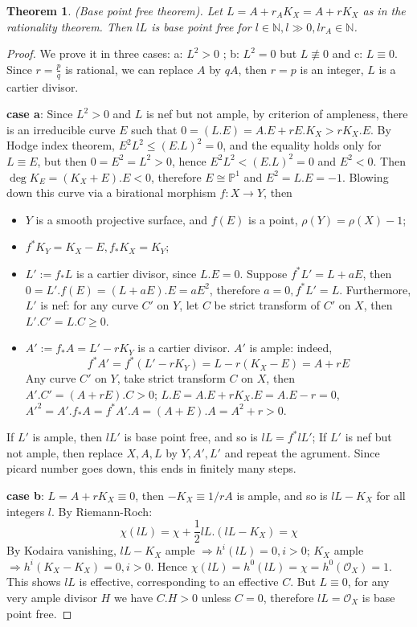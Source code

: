 \documentclass{article}
\newtheorem{thm}[defn]{Theorem}
\begin{document}
\begin{thm}
	(Base point free theorem). Let $ L=A+r_AK_X=A+rK_X $ as in the rationality theorem. Then $ lL $ is base point free for $ l\in\mathbb{N}, l\gg 0, lr_A\in \mathbb{N} $.
\end{thm}
\begin{proof}
	We prove it in three cases: a: $  L^2>0$ ; b: $ L^2=0$ but $ L\not\equiv 0 $ and c: $ L\equiv0 $. Since $ r=\frac{p}{q} $ is rational, we can replace $ A $ by $ qA $, then $ r=p $ is an integer, $ L $ is a cartier divisor.
		
	\textbf{case a}: Since $ L^2>0 $ and $ L $ is nef but not ample, by criterion of ampleness, there is an irreducible curve $ E $ such that $ 0=(L.E)=A.E+rE.K_X>rK_X.E $. By Hodge index theorem, $ E^2L^2\leqslant (E.L)^2=0 $, and the equality holds only for $ L\equiv E $, but then $ 0=E^2=L^2>0 $,   hence $ E^2L^2< (E.L)^2=0 $ and $ E^2<0 $. Then $ \deg K_E =(K_X+E).E<0 $, therefore $ E\cong \mathbb{P}^1 $ and $ E^2=L.E=-1 $. Blowing down this curve via a birational morphism $ f:X\to Y $, then
	\begin{itemize}
		\item $ Y $ is a smooth projective surface, and $ f(E) $ is a point, $ \rho (Y)=\rho(X)-1 $;
		\item $ f^*K_Y=K_X-E, f_*K_X=K_Y $;
		\item $ L':=f_*L $ is a cartier divisor, since $ L.E=0 $. Suppose $ f^*L'=L +aE $, then $ 0=L'.f(E)=(L+aE).E=aE^2 $, therefore $ a=0,f^*L'=L $. Furthermore, $ L'  $ is nef: for any curve $ C' $ on $ Y $, let $ C $ be strict transform of $ C' $ on $ X $, then $ L'.C'=L.C\geqslant0 $.
		\item $ A':=f_*A=L'-rK_Y $ is a cartier divisor. $ A' $ is ample: indeed, 
		$$ f^*A'=f^*(L'-rK_Y)=L-r(K_X-E)=A+rE $$
		Any curve $ C' $ on $ Y $, take strict transform $ C $ on $ X $, then $ A'.C'=(A+rE).C>0 $; $ L.E=A.E+rK_X.E=A.E-r=0 $, $ A'^2=A'.f_*A=f^*A'.A=(A+E).A=A^2+r>0 $.
	\end{itemize}   
	If $ L' $ is ample, then $ lL' $ is base point free, and so is $ lL=f^*lL' $; If $ L' $ is nef but not ample, then replace $ X,A,L $ by $ Y,A',L' $ and repeat the agrument. Since picard number goes down, this ends in finitely many steps.
	
	\textbf{case b}: $ L=A+rK_X\equiv 0 $, then $ -K_X\equiv 1/rA $ is ample, and so is $ lL-K_X $ for all integers $ l $. By Riemann-Roch:
	$$ \chi (lL)=\chi+\frac{1}{2}lL.(lL-K_X)=\chi $$
	By Kodaira vanishing, $ lL-K_X $ ample $ \Rightarrow h^i(lL)=0,i>0$; $ K_X $ ample $ \Rightarrow h^i(K_X-K_X)=0,i>0$. Hence $ \chi(lL)=h^0(lL)=\chi=h^0(\mathcal{O}_X)=1 $. This shows $ lL $ is effective, corresponding to an effective $ C $. But $ L\equiv 0 $, for any very ample divisor $ H $ we have $ C.H>0 $ unless $ C=0 $, therefore $ lL=\mathcal{O}_X $ is base point free. 
	

\end{proof}
\end{document}
